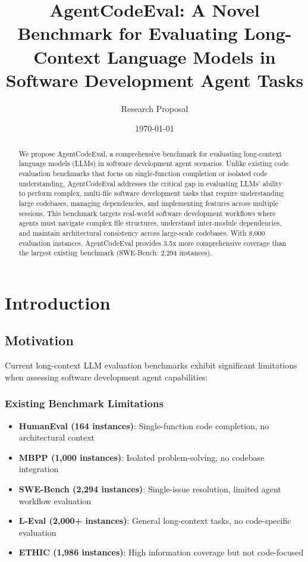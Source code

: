 \documentclass{article}
\title{AgentCodeEval: A Novel Benchmark for Evaluating Long-Context Language Models in Software Development Agent Tasks}
\author{Research Proposal}
\date{\today}
\begin{document}
\maketitle

\begin{abstract}
We propose AgentCodeEval, a comprehensive benchmark for evaluating long-context language models (LLMs) in software development agent scenarios. Unlike existing code evaluation benchmarks that focus on single-function completion or isolated code understanding, AgentCodeEval addresses the critical gap in evaluating LLMs' ability to perform complex, multi-file software development tasks that require understanding large codebases, managing dependencies, and implementing features across multiple sessions. This benchmark targets real-world software development workflows where agents must navigate complex file structures, understand inter-module dependencies, and maintain architectural consistency across large-scale codebases. With 8,000 evaluation instances, AgentCodeEval provides 3.5x more comprehensive coverage than the largest existing benchmark (SWE-Bench: 2,294 instances).
\end{abstract}

\section{Introduction}

\subsection{Motivation}
Current long-context LLM evaluation benchmarks exhibit significant limitations when assessing software development agent capabilities:

\subsubsection{Existing Benchmark Limitations}
\begin{itemize}
    \item \textbf{HumanEval (164 instances)}: Single-function code completion, no architectural context
    \item \textbf{MBPP (1,000 instances)}: Isolated problem-solving, no codebase integration
    \item \textbf{SWE-Bench (2,294 instances)}: Single-issue resolution, limited agent workflow evaluation
    \item \textbf{L-Eval (2,000+ instances)}: General long-context tasks, no code-specific evaluation
    \item \textbf{ETHIC (1,986 instances)}: High information coverage but not code-focused
\end{itemize}
\end{document}
